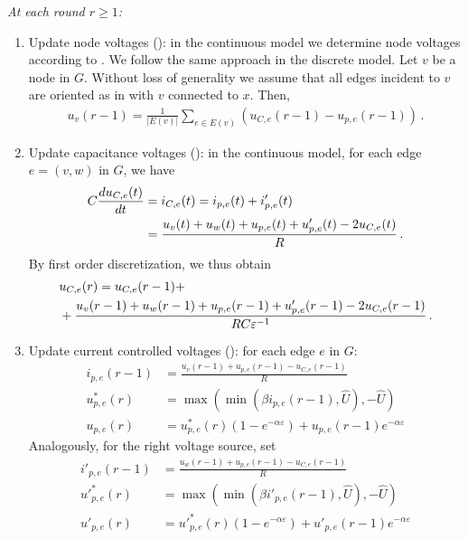 \noindent
{\em At each round $r \ge 1$:}
\begin{enumerate}
\item Update node voltages (): in the continuous model we determine node voltages according to .
We follow the same approach in the discrete model.
Let $v$ be a node in $G$. Without loss of generality we assume that all edges incident to $v$ are oriented as in  with $v$ connected to $x$.
Then,
\begin{align}
u_v(r-1) = \frac{1}{|E(v)|}\sum_{e \in E(v)}(u_{C,e}(r-1)-u_{p,e}(r-1))\,.\label{eq:dis:u}
\end{align}

\item Update capacitance voltages (): in the continuous model, for each edge $e=(v,w)$ in $G$, we have
\begin{align}
  C\frac{d u_{C,e}(t)}{dt} &= i_{C,e}(t) = i_{p,e}(t) + i'_{p,e}(t)\notag\\
  &= \frac{u_v(t)+u_w(t)+u_{p,e}(t)+u'_{p,e}(t)-2u_{C,e}(t)}{R}\,.
\end{align}
By first order discretization, we thus obtain
\begin{align}
  &u_{C,e}(r) = u_{C,e}(r-1) +\notag\\
  &+\frac{u_v(r-1)+u_w(r-1)+u_{p,e}(r-1)+u'_{p,e}(r-1)-2u_{C,e}(r-1)}{RC\varepsilon^{-1}}\,.\label{eq:dis:uC}
\end{align}

\item Update current controlled voltages (): for each edge $e$ in $G$:
\begin{align}
i_{p,e}(r-1) &= \frac{u_v(r-1)+u_{p,e}(r-1)-u_{C,e}(r-1)}{R}\label{eq:left_up_18}\\  
u^*_{p,e}(r) &= \max(\min(\beta i_{p,e}(r-1),\hat{U}),-\hat{U})\label{eq:left_up_19}\\
u_{p,e}(r)   &= u^*_{p,e}(r)(1-e^{-\alpha \varepsilon})+ u_{p,e}(r-1)e^{-\alpha \varepsilon}\label{eq:left_up_20}
\end{align}
Analogously, for the right voltage source, set
\begin{align}
i'_{p,e}(r-1) &= \frac{u_w(r-1)+u_{p,e}(r-1)-u_{C,e}(r-1)}{R}\label{eq:right_up_21}\\  
{u'}^*_{p,e}(r) &= \max(\min(\beta i'_{p,e}(r-1),\hat{U}),-\hat{U})\label{eq:right_up_22}\\
u'_{p,e}(r)   &= {u'}^*_{p,e}(r)(1-e^{-\alpha \varepsilon})+ u'_{p,e}(r-1)e^{-\alpha \varepsilon}\label{eq:right_up_23}
\end{align}

\end{enumerate}

